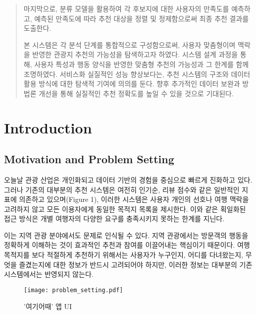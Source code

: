 \documentclass[sigconf]{acmart}
\begin{document}
\begin{CJK}{UTF8}{mj}
\begin{abstract}
마지막으로, 분류 모델을 활용하여 각 후보지에 대한 사용자의 만족도를 예측하고, 예측된 만족도에 따라 추천 대상을 정렬 및 정제함으로써 최종 추천 결과를 도출한다.

본 시스템은 각 분석 단계를 통합적으로 구성함으로써, 사용자 맞춤형이며 맥락을 반영한 관광지 추천의 가능성을 탐색하고자 하였다. 시스템 설계 과정을 통해, 사용자 특성과 행동 양식을 반영한 맞춤형 추천의 가능성과 그 한계를 함께 조명하였다. 서비스화 실질적인 성능 향상보다는, 추천 시스템의 구조와 데이터 활용 방식에 대한 탐색적 기여에 의의를 둔다. 향후 추가적인 데이터 보완과 방법론 개선을 통해 실질적인 추천 정확도를 높일 수 있을 것으로 기대된다.

\end{abstract}

\maketitle

\section{Introduction} %

\subsection{Motivation and Problem Setting}

오늘날 관광 산업은 개인화되고 데이터 기반의 경험을 중심으로 빠르게 진화하고 있다. 그러나 기존의 대부분의 추천 시스템은 여전히 인기순, 리뷰 점수와 같은 일반적인 지표에 의존하고 있으며(Figure 1), 이러한 시스템은 사용자 개인의 선호나 여행 맥락을 고려하지 않고 모든 이용자에게 동일한 목적지 목록을 제시한다. 이와 같은 획일화된 접근 방식은 개별 여행자의 다양한 요구를 충족시키지 못하는 한계를 지닌다.

이는 지역 관광 분야에서도 문제로 인식될 수 있다. 지역 관광에서는 방문객의 행동을 정확하게 이해하는 것이 효과적인 추천과 참여를 이끌어내는 핵심이기 때문이다. 여행 목적지를 보다 적절하게 추천하기 위해서는 사용자가 누구인지, 어디를 다녀왔는지, 무엇을 즐겼는지에 대한 정보가 반드시 고려되어야 하지만, 이러한 정보는 대부분의 기존 시스템에서는 반영되지 않는다.

\begin{figure}[H]
    \centering
    \texttt{[image: problem\_setting.pdf]}
    \caption{'여기어때' 앱 UI}
    \label{fig:enter-label}
\end{figure}


\end{CJK}
\end{document}
